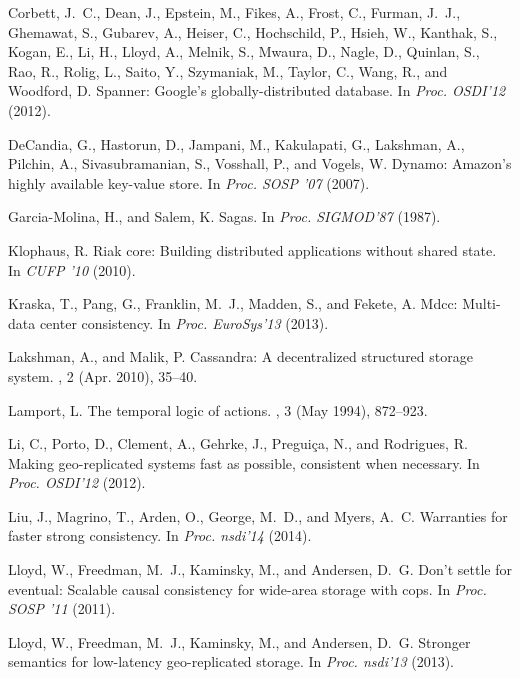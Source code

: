 \documentclass[conference]{IEEEtran}
\begin{document}
{\begin{thebibliography}{10}
{\sc Corbett, J.~C., Dean, J., Epstein, M., Fikes, A., Frost, C., Furman,
  J.~J., Ghemawat, S., Gubarev, A., Heiser, C., Hochschild, P., Hsieh, W.,
  Kanthak, S., Kogan, E., Li, H., Lloyd, A., Melnik, S., Mwaura, D., Nagle, D.,
  Quinlan, S., Rao, R., Rolig, L., Saito, Y., Szymaniak, M., Taylor, C., Wang,
  R., and Woodford, D.}
\newblock Spanner: Google's globally-distributed database.
\newblock In {\em Proc. OSDI'12} (2012).

{\sc DeCandia, G., Hastorun, D., Jampani, M., Kakulapati, G., Lakshman, A.,
  Pilchin, A., Sivasubramanian, S., Vosshall, P., and Vogels, W.}
\newblock Dynamo: Amazon's highly available key-value store.
\newblock In {\em Proc. SOSP '07} (2007).



{\sc Garcia-Molina, H., and Salem, K.}
\newblock Sagas.
\newblock In {\em Proc. SIGMOD'87} (1987).

{\sc Klophaus, R.}
\newblock Riak core: Building distributed applications without shared state.
\newblock In {\em CUFP '10} (2010).

{\sc Kraska, T., Pang, G., Franklin, M.~J., Madden, S., and Fekete, A.}
\newblock Mdcc: Multi-data center consistency.
\newblock In {\em Proc. EuroSys'13} (2013).

{\sc Lakshman, A., and Malik, P.}
\newblock Cassandra: A decentralized structured storage system.
, 2 (Apr. 2010), 35--40.

{\sc Lamport, L.}
\newblock The temporal logic of actions.
, 3 (May 1994), 872--923.

{\sc Li, C., Porto, D., Clement, A., Gehrke, J., Pregui\c{c}a, N., and
  Rodrigues, R.}
\newblock Making geo-replicated systems fast as possible, consistent when
  necessary.
\newblock In {\em Proc. OSDI'12} (2012).

{\sc Liu, J., Magrino, T., Arden, O., George, M.~D., and Myers, A.~C.}
\newblock Warranties for faster strong consistency.
\newblock In {\em Proc. nsdi'14} (2014).

{\sc Lloyd, W., Freedman, M.~J., Kaminsky, M., and Andersen, D.~G.}
\newblock Don't settle for eventual: Scalable causal consistency for wide-area
  storage with cops.
\newblock In {\em Proc. SOSP '11} (2011).

{\sc Lloyd, W., Freedman, M.~J., Kaminsky, M., and Andersen, D.~G.}
\newblock Stronger semantics for low-latency geo-replicated storage.
\newblock In {\em Proc. nsdi'13} (2013).


\end{thebibliography}}
\end{document}

